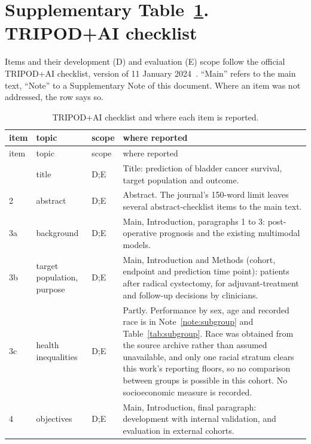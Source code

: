 \documentclass[11pt]{article}
\begin{document}
\clearpage
\section*{Supplementary Table~\ref{tab:tripod}. TRIPOD+AI checklist}

Items and their development (D) and evaluation (E) scope follow the official TRIPOD+AI checklist,
version of 11 January 2024~\citep{collins2024tripodai}. ``Main'' refers to the main text,
``Note'' to a Supplementary Note of this document. Where an item was not addressed, the row says
so.

{\small
\setlength{\tabcolsep}{4pt}
\begin{longtable}{p{}p{}p{}p{}}
\caption{TRIPOD+AI checklist and where each item is reported.}\label{tab:tripod}\\
\toprule
item & topic & scope & where reported \\
\midrule
\endfirsthead
\toprule
item & topic & scope & where reported \\
\midrule
\endhead
\bottomrule
\endfoot
1 & title & D;E & Title: prediction of bladder cancer survival, target population and outcome. \\
2 & abstract & D;E & Abstract. The journal's 150-word limit leaves several abstract-checklist items to the main text. \\
3a & background & D;E & Main, Introduction, paragraphs 1 to 3: post-operative prognosis and the existing multimodal models. \\
3b & target population, purpose & D;E & Main, Introduction and Methods (cohort, endpoint and prediction time point): patients after radical cystectomy, for adjuvant-treatment and follow-up decisions by clinicians. \\
3c & health inequalities & D;E & Partly. Performance by sex, age and recorded race is in Note~\ref{note:subgroup} and Table~\ref{tab:subgroup}. Race was obtained from the source archive rather than assumed unavailable, and only one racial stratum clears this work's reporting floors, so no comparison between groups is possible in this cohort. No socioeconomic measure is recorded. \\
4 & objectives & D;E & Main, Introduction, final paragraph: development with internal validation, and evaluation in external cohorts. \\

\end{longtable}}
\end{document}

